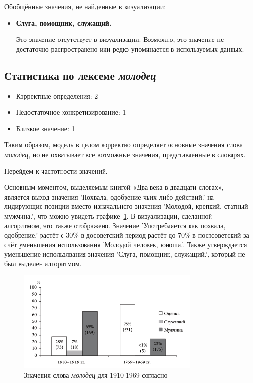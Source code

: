 Обобщённые значения, не найденные в визуализации:

\begin{itemize}
    \item \textbf{Слуга, помощник, служащий.}

    Это значение отсутствует в визуализации.
    Возможно, это значение не достаточно распространено или редко упоминается в используемых данных.
\end{itemize}

\subsection*{Статистика по лексеме \textit{молодец}}
\begin{itemize}
    \item Корректные определения: 2
    \item Недостаточное конкретизирование: 1
    \item Близкое значение: 1
\end{itemize}

Таким образом, модель в целом корректно определяет основные значения слова \textit{молодец},
но не охватывает все возможные значения, представленные в словарях.

Перейдем к частотности значений.

Основным моментом, выделяемым книгой «Два века в двадцати словах», является
выход значения ’Похвала, одобрение чьих-либо действий.’ на лидирующие позиции
вместо изначального значения ’Молодой, крепкий, статный мужчина.’, что можно увидеть
графике~\ref{fig:TwoCenturiesMolodets}.
В визуализации, сделанной алгоритмом, это также отображено.
Значение ’Употребляется как похвала, одобрение.’ растёт с 30\% в досоветский период
растёт до 70\% в постсоветский за счёт уменьшения использования ’Молодой человек, юноша.’.
Также утверждается уменьшение использлвания значения ’Слуга, помощник, служащий.’,
который не был выделен алгоритмом.

\begin{figure}[H]
    \centering %
    \includegraphics[width=0.8\textwidth]{img/book/molodets/1910-1969}
    \caption{Значения слова \textit{молодец} для 1910-1969 согласно~\cite{TwoCenturies}}
    \label{fig:TwoCenturiesMolodets}
\end{figure}

